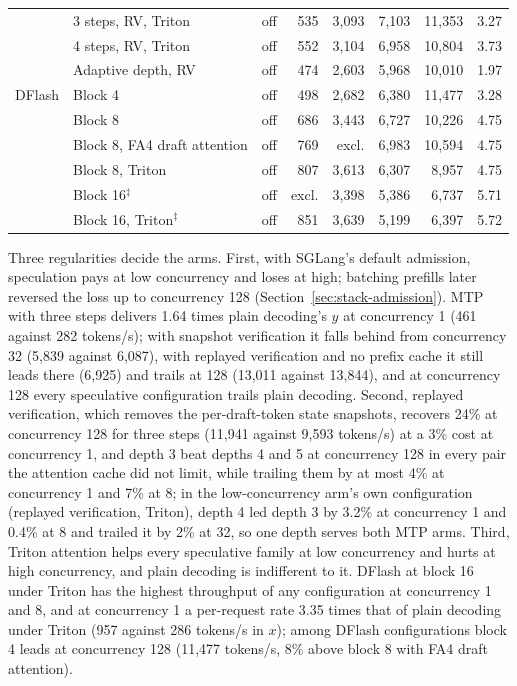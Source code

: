 \begin{table}[!t]
\begin{tabular}{@{}llcrrrrc@{}}
& 3 steps, RV, Triton & off & 535 & 3{,}093 & 7{,}103 & 11{,}353 & 3.27\\
& 4 steps, RV, Triton & off & 552 & 3{,}104 & 6{,}958 & 10{,}804 & 3.73\\
& Adaptive depth, RV & off & 474 & 2{,}603 & 5{,}968 & 10{,}010 & 1.97\\\addlinespace
DFlash & Block 4 & off & 498 & 2{,}682 & 6{,}380 & 11{,}477 & 3.28\\
& Block 8 & off & 686 & 3{,}443 & 6{,}727 & 10{,}226 & 4.75\\
& Block 8, FA4 draft attention & off & 769 & excl. & 6{,}983 & 10{,}594 & 4.75\\
& Block 8, Triton & off & 807 & 3{,}613 & 6{,}307 & 8{,}957 & 4.75\\
& Block 16$^\ddagger$ & off & excl. & 3{,}398 & 5{,}386 & 6{,}737 & 5.71\\
& Block 16, Triton$^\ddagger$ & off & 851 & 3{,}639 & 5{,}199 & 6{,}397 & 5.72\\\bottomrule
\end{tabular}
\end{table}

Three regularities decide the arms. First, with SGLang's default admission, speculation pays at low concurrency and loses at high; batching prefills later reversed the loss up to concurrency 128 (Section~\ref{sec:stack-admission}). MTP with three steps delivers 1.64 times plain decoding's $y$ at concurrency 1 (461 against 282 tokens/s); with snapshot verification it falls behind from concurrency 32 (5,839 against 6,087), with replayed verification and no prefix cache it still leads there (6,925) and trails at 128 (13,011 against 13,844), and at concurrency 128 every speculative configuration trails plain decoding. Second, replayed verification, which removes the per-draft-token state snapshots, recovers 24\% at concurrency 128 for three steps (11,941 against 9,593 tokens/s) at a 3\% cost at concurrency 1, and depth 3 beat depths 4 and 5 at concurrency 128 in every pair the attention cache did not limit, while trailing them by at most 4\% at concurrency 1 and 7\% at 8; in the low-concurrency arm's own configuration (replayed verification, Triton), depth 4 led depth 3 by 3.2\% at concurrency 1 and 0.4\% at 8 and trailed it by 2\% at 32, so one depth serves both MTP arms. Third, Triton attention helps every speculative family at low concurrency and hurts at high concurrency, and plain decoding is indifferent to it. DFlash at block 16 under Triton has the highest throughput of any configuration at concurrency 1 and 8, and at concurrency 1 a per-request rate 3.35 times that of plain decoding under Triton (957 against 286 tokens/s in $x$); among DFlash configurations block 4 leads at concurrency 128 (11,477 tokens/s, 8\% above block 8 with FA4 draft attention).

